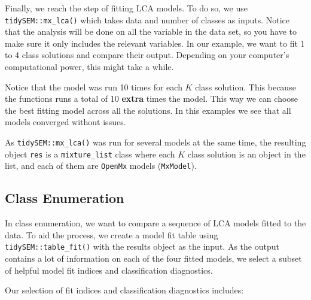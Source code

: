 \documentclass[
  ,man,floatsintext]{apa6}
\begin{document}
Finally, we reach the step of fitting LCA models. To do so, we use
\texttt{tidySEM::mx\_lca()} which takes data and number of classes as inputs. Notice that the analysis will be done on all the variable in the data set, so you have to make sure it only includes the relevant variables. In
our example, we want to fit 1 to 4 class solutions and compare their
output. Depending on your computer's computational power, this might
take a while.

Notice that the model was run 10 times for each \(K\) class solution. This because the functions runs a total of 10 \textbf{extra} times the model. This way we can choose the best fitting model across all the solutions. In this examples we see that all models converged without issues.

As \texttt{tidySEM::mx\_lca()} was run for several models at the same time, the resulting object \texttt{res} is a \texttt{mixture\_list} class where each \(K\) class solution is an object in the list, and each of them are \texttt{OpenMx} models (\texttt{MxModel}).

\hypertarget{class-enumeration-1}{%
\subsection{Class Enumeration}\label{class-enumeration-1}}

In class enumeration, we want to compare a sequence of LCA models fitted
to the data. To aid the process, we create a model fit table using
\texttt{tidySEM::table\_fit()} with the results object as the input. As the
output contains a lot of information on each of the four fitted models,
we select a subset of helpful model fit indices and classification
diagnostics.

Our selection of fit indices and classification diagnostics includes:
\end{document}
